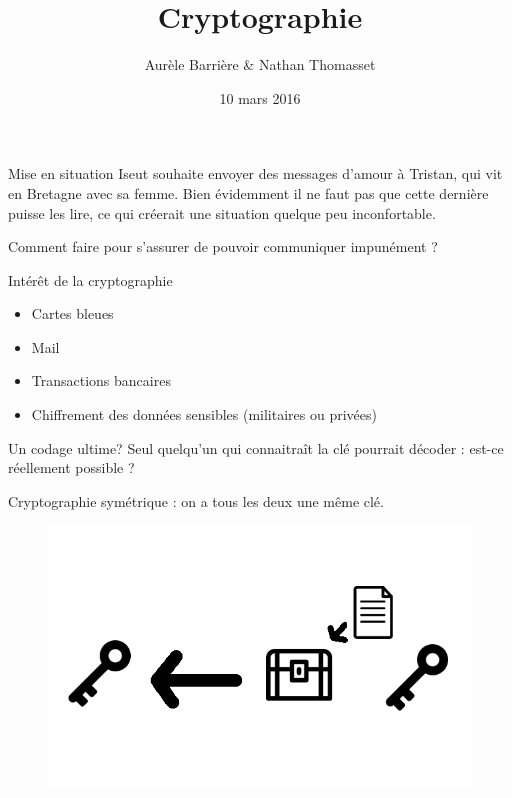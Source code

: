\documentclass{beamer}
\author{Aurèle Barrière \& Nathan Thomasset}
\title{Cryptographie}
\date{10 mars 2016}
\begin{document}
\begin{frame}
\maketitle
\end{frame}

\begin{frame}{Mise en situation}
  Iseut souhaite envoyer des messages d'amour à Tristan, qui vit en Bretagne avec sa femme. Bien évidemment il ne faut pas que cette dernière puisse les lire, ce qui créerait une situation quelque peu inconfortable.
  \begin{block}{}
   Comment faire pour s'assurer de pouvoir communiquer impunément ?
   \end{block}

  \end{frame}

\begin{frame}{Intérêt de la cryptographie}
  \begin{itemize}
  \item Cartes bleues
    
  \item Mail
    
  \item Transactions bancaires
  
  \item Chiffrement des données sensibles (militaires ou privées)
\end{itemize}
\end{frame}

\begin{frame}{Un codage ultime?}
  Seul quelqu'un qui connaitraît la clé pourrait décoder : est-ce réellement possible ?

Cryptographie symétrique : on a tous les deux une même clé.
\begin{figure}
\centering
\includegraphics[scale = 0.4]{symetric.png}
\end{figure}
  \end{frame}
\end{document}

